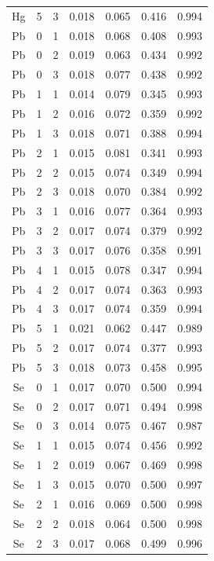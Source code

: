 \documentclass[ms, hidelinks]{uncgdissertationexp3}
\theoremstyle{plain}
\theoremstyle{definition}
\theoremstyle{remark}
\begin{document}
\begin{longtable}{ccccccc}
  Hg & 5 & 3 & 0.018 & 0.065 & 0.416 & 0.994\\
  \rowcolor{gray!6}  Pb & 0 & 1 & 0.018 & 0.068 & 0.408 & 0.993\\
  Pb & 0 & 2 & 0.019 & 0.063 & 0.434 & 0.992\\
  \rowcolor{gray!6}  Pb & 0 & 3 & 0.018 & 0.077 & 0.438 & 0.992\\
  Pb & 1 & 1 & 0.014 & 0.079 & 0.345 & 0.993\\
  \rowcolor{gray!6}  Pb & 1 & 2 & 0.016 & 0.072 & 0.359 & 0.992\\
  Pb & 1 & 3 & 0.018 & 0.071 & 0.388 & 0.994\\
  \rowcolor{gray!6}  Pb & 2 & 1 & 0.015 & 0.081 & 0.341 & 0.993\\
  Pb & 2 & 2 & 0.015 & 0.074 & 0.349 & 0.994\\
  \rowcolor{gray!6}  Pb & 2 & 3 & 0.018 & 0.070 & 0.384 & 0.992\\
  Pb & 3 & 1 & 0.016 & 0.077 & 0.364 & 0.993\\
  \rowcolor{gray!6}  Pb & 3 & 2 & 0.017 & 0.074 & 0.379 & 0.992\\
  Pb & 3 & 3 & 0.017 & 0.076 & 0.358 & 0.991\\
  \rowcolor{gray!6}  Pb & 4 & 1 & 0.015 & 0.078 & 0.347 & 0.994\\
  Pb & 4 & 2 & 0.017 & 0.074 & 0.363 & 0.993\\
  \rowcolor{gray!6}  Pb & 4 & 3 & 0.017 & 0.074 & 0.359 & 0.994\\
  Pb & 5 & 1 & 0.021 & 0.062 & 0.447 & 0.989\\
  \rowcolor{gray!6}  Pb & 5 & 2 & 0.017 & 0.074 & 0.377 & 0.993\\
  Pb & 5 & 3 & 0.018 & 0.073 & 0.458 & 0.995\\
  \rowcolor{gray!6}  Se & 0 & 1 & 0.017 & 0.070 & 0.500 & 0.994\\
  Se & 0 & 2 & 0.017 & 0.071 & 0.494 & 0.998\\
  \rowcolor{gray!6}  Se & 0 & 3 & 0.014 & 0.075 & 0.467 & 0.987\\
  Se & 1 & 1 & 0.015 & 0.074 & 0.456 & 0.992\\
  \rowcolor{gray!6}  Se & 1 & 2 & 0.019 & 0.067 & 0.469 & 0.998\\
  Se & 1 & 3 & 0.015 & 0.070 & 0.500 & 0.997\\
  \rowcolor{gray!6}  Se & 2 & 1 & 0.016 & 0.069 & 0.500 & 0.998\\
  Se & 2 & 2 & 0.018 & 0.064 & 0.500 & 0.998\\
  \rowcolor{gray!6}  Se & 2 & 3 & 0.017 & 0.068 & 0.499 & 0.996\\

\end{longtable}
\end{document}
